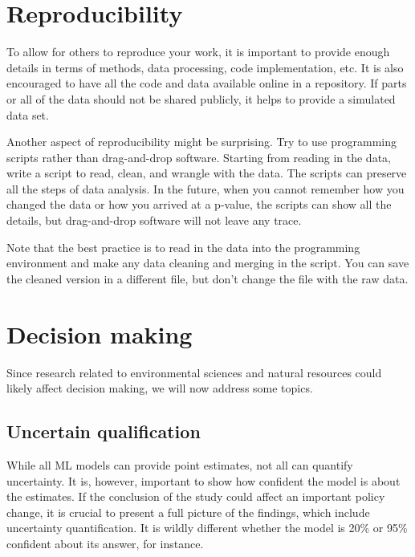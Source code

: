 \documentclass[
]{book}
\begin{document}
\hypertarget{reproducibility}{%
\section{Reproducibility}\label{reproducibility}}

To allow for others to reproduce your work, it is important to provide enough details in terms of methods, data processing, code implementation, etc. It is also encouraged to have all the code and data available online in a repository. If parts or all of the data should not be shared publicly, it helps to provide a simulated data set.

Another aspect of reproducibility might be surprising. Try to use programming scripts rather than drag-and-drop software. Starting from reading in the data, write a script to read, clean, and wrangle with the data. The scripts can preserve all the steps of data analysis. In the future, when you cannot remember how you changed the data or how you arrived at a p-value, the scripts can show all the details, but drag-and-drop software will not leave any trace.

Note that the best practice is to read in the data into the programming environment and make any data cleaning and merging in the script. You can save the cleaned version in a different file, but don't change the file with the raw data.

\hypertarget{decision-making}{%
\section{Decision making}\label{decision-making}}

Since research related to environmental sciences and natural resources could likely affect decision making, we will now address some topics.

\hypertarget{uncertain-qualification}{%
\subsection{Uncertain qualification}\label{uncertain-qualification}}

While all ML models can provide point estimates, not all can quantify uncertainty. It is, however, important to show how confident the model is about the estimates. If the conclusion of the study could affect an important policy change, it is crucial to present a full picture of the findings, which include uncertainty quantification. It is wildly different whether the model is 20\% or 95\% confident about its answer, for instance.
\end{document}
